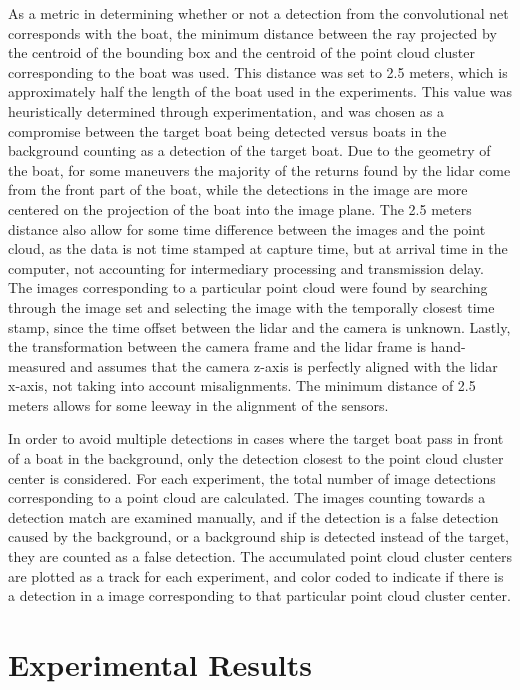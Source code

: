 As a metric in determining whether or not a detection from the convolutional net corresponds with the boat, the minimum distance between the ray projected by the centroid of the bounding box and the centroid of the point cloud cluster corresponding to the boat was used. This distance was set to 2.5 meters, which is approximately half the length of the boat used in the experiments. This value was heuristically determined through experimentation, and was chosen as a compromise between the target boat being detected versus boats in the background counting as a detection of the target boat. Due to the geometry of the boat, for some maneuvers the majority of the returns found by the lidar come from the front part of the boat, while the detections in the image are more centered on the projection of the boat into the image plane. The 2.5 meters distance also allow for some time difference between the images and the point cloud, as the data is not time stamped at capture time, but at arrival time in the computer, not accounting for intermediary processing and transmission delay. The images corresponding to a particular point cloud were found by searching through the image set and selecting the image with the temporally closest time stamp, since the time offset between the lidar and the camera is unknown. Lastly, the transformation between the camera frame and the lidar frame is hand-measured and assumes that the camera z-axis is perfectly aligned with the lidar x-axis, not taking into account misalignments. The minimum distance of 2.5 meters allows for some leeway in the alignment of the sensors. 

In order to avoid multiple detections in cases where the target boat pass in front of a boat in the background, only the detection closest to the point cloud cluster center is considered. For each experiment, the total number of image detections corresponding to a point cloud are calculated. The images counting towards a detection match are examined manually, and if the detection is a false detection caused by the background, or a background ship is detected instead of the target, they are counted as a false detection. The accumulated point cloud cluster centers are plotted as a track for each experiment, and color coded to indicate if there is a detection in a image corresponding to that particular point cloud cluster center.
\section{Experimental Results}
